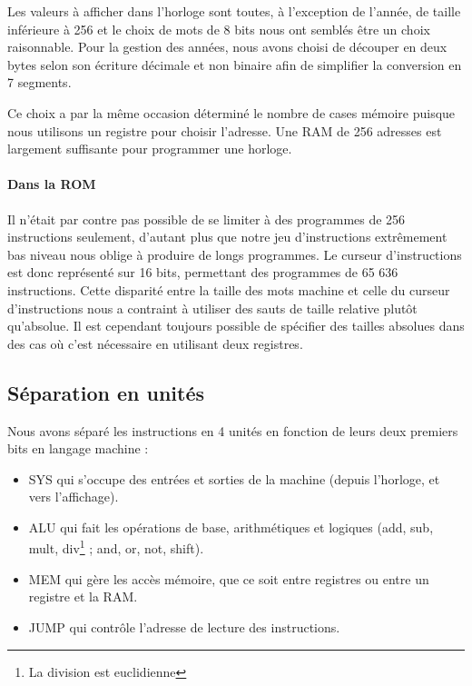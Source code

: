 \documentclass{article}
\begin{document}
Les valeurs à afficher dans l'horloge sont toutes, à l'exception de l'année, de
taille inférieure à 256 et le choix de mots de 8 bits nous ont semblés être un
choix raisonnable. Pour la gestion des années, nous avons choisi de découper en
deux bytes selon son écriture décimale et non binaire afin de simplifier la
conversion en 7 segments.

Ce choix a par la même occasion déterminé le nombre de cases mémoire puisque nous
utilisons un registre pour choisir l'adresse. Une RAM de 256 adresses est largement
suffisante pour programmer une horloge.

\paragraph{Dans la ROM}
Il n'était par contre pas possible de se limiter à des programmes de 256 instructions
seulement, d'autant plus que notre jeu d'instructions extrêmement bas niveau nous
oblige à produire de longs programmes. Le curseur d'instructions est donc représenté
sur 16 bits, permettant des programmes de 65 636 instructions. Cette disparité
entre la taille des mots machine et celle du curseur d'instructions nous a contraint
à utiliser des sauts de taille relative plutôt qu'absolue. Il est cependant toujours
possible de spécifier des tailles absolues dans des cas où c'est nécessaire en
utilisant deux registres.

\subsection{Séparation en unités}
Nous avons séparé les instructions en 4 unités en fonction de leurs
deux premiers bits en langage machine :
\begin{itemize}
  \item SYS qui s'occupe des entrées et sorties de la machine (depuis
    l'horloge, et vers l'affichage).
  \item ALU qui fait les opérations de base, arithmétiques et logiques (add,
    sub, mult, div\footnote{La division est euclidienne} ; and, or, not, shift).
  \item MEM qui gère les accès mémoire, que ce soit entre registres ou entre un
  registre et la RAM.
  \item JUMP qui contrôle l'adresse de lecture des instructions.
\end{itemize}
\end{document}
